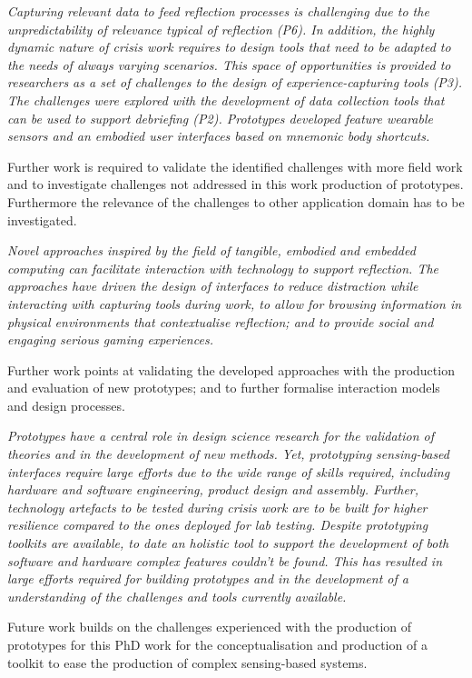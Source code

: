 \begin{framed}
\emph{Capturing relevant data to feed reflection processes is challenging due to the unpredictability of relevance typical of reflection (P6). In addition, the highly dynamic nature of crisis work requires to design tools that need to be adapted to the  needs of always varying scenarios. This space of opportunities is provided to researchers as a set of challenges to the design of experience-capturing tools (P3). The challenges were explored with the development of data collection tools that can be used to support debriefing (P2). Prototypes developed feature wearable sensors and an embodied user interfaces based on mnemonic body shortcuts.}
\par
Further work is required to validate the identified challenges with more field work and to investigate challenges not addressed in this work production of prototypes. Furthermore the relevance of the challenges to other application domain has to be investigated. 
\end{framed}

\begin{framed}
\emph{Novel approaches inspired by the field of tangible, embodied and embedded computing can facilitate interaction with technology to support reflection. The approaches have driven the design of interfaces to reduce distraction while interacting with capturing tools during work, to allow for browsing information in physical environments that contextualise reflection; and to provide social and engaging serious gaming experiences.}
\par
Further work points at validating the developed approaches with the production and evaluation of new prototypes; and to further formalise interaction models and design processes.
\end{framed}

\begin{framed}
\emph{Prototypes have a central role in design science research for the validation of theories and in the development of new methods. Yet, prototyping sensing-based interfaces require large efforts due to the wide range of skills required, including hardware and software engineering, product design and assembly. Further, technology artefacts to be tested during crisis work are to be built for higher resilience compared to the ones deployed for lab testing. Despite prototyping toolkits are available, to date an holistic tool to support the development of both software and hardware complex features couldn't be found. This has resulted in large efforts required for building prototypes and in the development of a understanding of the challenges and tools currently available.}
\par
Future work builds on the challenges experienced with the production of prototypes for this PhD work for the conceptualisation and production of a toolkit to ease the production of complex sensing-based systems. 
\end{framed}

